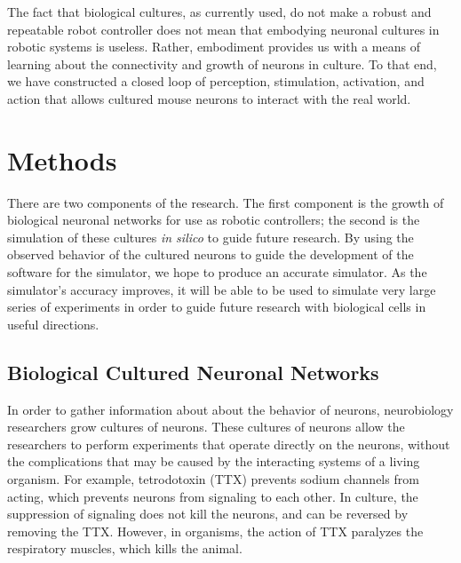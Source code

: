\documentclass[letterpaper]{article}
\begin{document}
The fact that biological cultures, as currently used, do not make a robust and repeatable robot controller does not mean that embodying neuronal cultures in robotic systems is useless. 
Rather, embodiment provides us with a means of learning about the connectivity and growth of neurons in culture. 
To that end, we have constructed a closed loop of perception, stimulation, activation, and action that allows cultured mouse neurons to interact with the real world.

\section{Methods}

There are two components of the research. 
The first component is the growth of biological neuronal networks for use as robotic controllers; the second is the simulation of these cultures \textit{in silico} to guide future research. 
By using the observed behavior of the cultured neurons to guide the development of the software for the simulator, we hope to produce an accurate simulator. 
As the simulator's accuracy improves, it will be able to be used to simulate very large series of experiments in order to guide future research with biological cells in useful directions. 

\subsection{Biological Cultured Neuronal Networks}

In order to gather information about about the behavior of neurons, neurobiology researchers grow cultures of neurons.
These cultures of neurons allow the researchers to perform experiments that operate directly on the neurons, without the complications that may be caused by the interacting systems of a living organism. 
For example, tetrodotoxin (TTX) prevents sodium channels from acting, which prevents neurons from signaling to each other. 
In culture, the suppression of signaling does not kill the neurons, and can be reversed by removing the TTX. 
However, in organisms, the action of TTX paralyzes the respiratory muscles, which kills the animal.  
\end{document}
